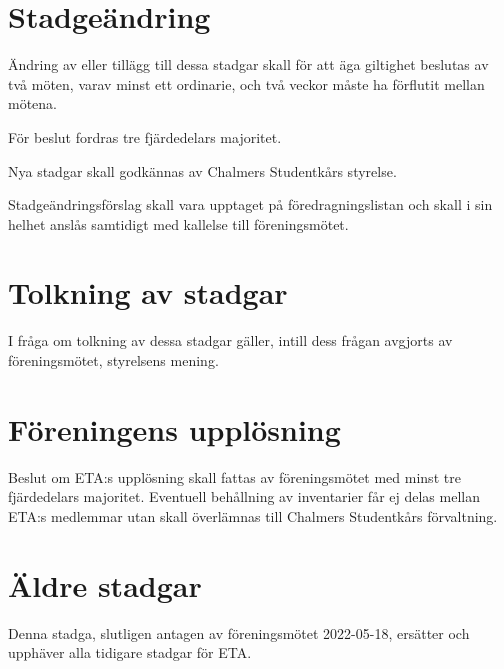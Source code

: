 \documentclass{article}
\newcounter{underparagraf}
\begin{document}
\section{Stadgeändring}
Ändring av eller tillägg till dessa stadgar skall för att äga giltighet beslutas av två möten, varav minst ett ordinarie, och två veckor måste ha förflutit mellan mötena.

För beslut fordras tre fjärdedelars majoritet.

Nya stadgar skall godkännas av Chalmers Studentkårs styrelse.

Stadgeändringsförslag skall vara upptaget på föredragningslistan och skall i sin helhet anslås samtidigt med kallelse till föreningsmötet.


\section{Tolkning av stadgar}
I fråga om tolkning av dessa stadgar gäller, intill dess frågan avgjorts av föreningsmötet, styrelsens mening.

\section{Föreningens upplösning}
 Beslut om ETA:s upplösning skall fattas av föreningsmötet med minst tre fjärdedelars majoritet. Eventuell behållning av inventarier får ej delas mellan ETA:s medlemmar utan skall överlämnas till Chalmers Studentkårs förvaltning.

\section{Äldre stadgar}

Denna stadga, slutligen antagen av föreningsmötet 2022-05-18, ersätter och upphäver alla tidigare stadgar för ETA.
\end{document}
